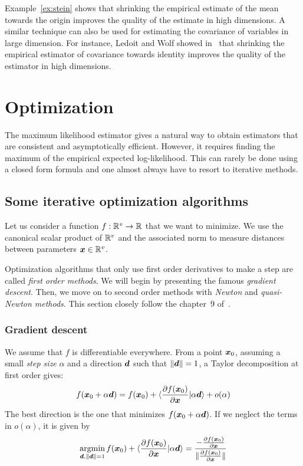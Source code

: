Example~\ref{ex:stein} shows that shrinking the empirical estimate of the mean towards the
origin improves the quality of the estimate in high dimensions. A similar technique can also be used for
estimating the covariance of variables in large dimension. For instance, Ledoit
and Wolf showed in~\cite{ledoit2004well} that shrinking the empirical estimator
of covariance towards identity improves the quality of the estimator in high dimensions.

\section{Optimization}
The maximum likelihood estimator gives a natural way to obtain estimators that
are consistent and asymptotically efficient.
However, it requires finding the maximum of the empirical expected
log-likelihood.
This can rarely be done using a closed form formula and one almost always have
to resort to iterative methods.


\subsection{Some iterative optimization algorithms}
Let us consider a function $f: \mathbb{R}^v \rightarrow \mathbb{R}$ that we
want to minimize. We use the canonical scalar product of $\mathbb{R}^v$ and the
associated norm to measure distances between parameters $\boldsymbol{x} \in \mathbb{R}^v$.


Optimization algorithms that only use first order derivatives to make a step are
called \emph{first order methods}. We will begin by presenting the famous
\emph{gradient descent}. Then, we move on to second order methods with \emph{Newton} and
\emph{quasi-Newton methods}. This section closely follow the chapter~9 of~\cite{boyd2004convex}.

\subsubsection{Gradient descent}
\label{sec:gd}
We assume that $f$ is differentiable everywhere.
From a point $\boldsymbol{x}_0$, assuming a small \emph{step size} $\alpha$ and a direction
$\boldsymbol{d}$ such that $\|\boldsymbol{d}\| = 1$, a Taylor decomposition at first order gives:
\begin{align}
f(\boldsymbol{x}_0 + \alpha \boldsymbol{d}) = f(\boldsymbol{x}_0) + \langle \frac{ \partial f(\boldsymbol{x}_0)}{\partial \boldsymbol{x}} | \alpha \boldsymbol{d} \rangle + o(\alpha) 
\end{align}
The best direction is the one that minimizes $f(\boldsymbol{x}_0 + \alpha \boldsymbol{d})$. If we
neglect the terms in $o(\alpha)$, it is given by
\begin{align}
  \operatorname*{argmin}_{\boldsymbol{d}, \|\boldsymbol{d}\| = 1} f(\boldsymbol{x}_0) + \langle \frac{ \partial f(\boldsymbol{x}_0)}{\partial \boldsymbol{x}} | \alpha \boldsymbol{d} \rangle = \frac{-\frac{ \partial f(\boldsymbol{x}_0)}{\partial \boldsymbol{x}}}{\|\frac{ \partial f(\boldsymbol{x}_0)}{\partial \boldsymbol{x}}\|}
\end{align}

